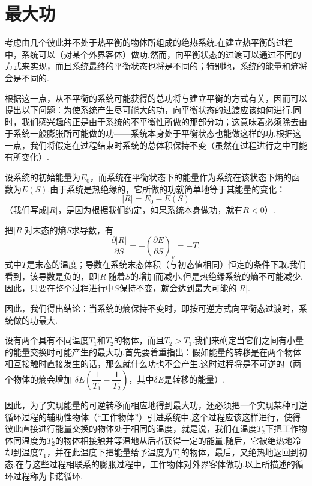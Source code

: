 \section{最大功}

考虑由几个彼此并不处于热平衡的物体所组成的绝热系统.在建立热平衡的过程中，系统可以（对某个外界客体）做功.然而，向平衡状态的过渡可以通过不同的方式来实现，而且系统最终的平衡状态也将是不同的；特别地，系统的能量和熵将会是不同的.

根据这一点，从不平衡的系统可能获得的总功将与建立平衡的方式有关，因而可以提出以下问题：为使系统产生尽可能大的功，向平衡状态的过渡应该如何进行.同时，我们感兴趣的正是由于系统的不平衡性所做的那部分功；这意味着必须除去由于系统一般膨胀所可能做的功——系统本身处于平衡状态也能做这样的功.根据这一点，我们将假定在过程结束时系统的总体积保持不变（虽然在过程进行之中可能有所变化）.

设系统的初始能量为$E_0$，而系统在平衡状态下的能量作为系统在该状态下熵的函数为$E(S)$.由于系统是热绝缘的，它所做的功就简单地等于其能量的变化：
\begin{equation*}
  |R|=E_0-E(S)
\end{equation*}
（我们写成$|R|$，是因为根据我们约定，如果系统本身做功，就有$R<0$）.

把$|R|$对末态的熵$S$求导数，有
\begin{equation*}
  \frac{\partial|R|}{\partial S}
  =-\left(\frac{\partial E}{\partial S}\right)_v=-T,
\end{equation*}
式中$T$是末态的温度；导数在系统末态体积（与初态值相同）恒定的条件下取.我们看到，该导数是负的，即$|R|$随着$S$的增加而减小.但是热绝缘系统的熵不可能减少.因此，只要在整个过程进行中$S$保持不变，就会达到最大可能的$|R|$.

因此，我们得出结论：当系统的熵保持不变时，即按可逆方式向平衡态过渡时，系统做的功最大.

设有两个具有不同温度$T_1$和$T_2$的物体，而且$T_2>T_1$.我们来确定当它们之间有小量的能量交换时可能产生的最大功.首先要着重指出：假如能量的转移是在两个物体相互接触时直接发生的话，那么就什么功也不会产生.这时过程将是不可逆的（两个物体的熵会增加
$\delta E\left(\dfrac{1}{T_1}-\dfrac{1}{T_2}\right)$，其中$\delta E$是转移的能量）.

因此，为了实现能量的可逆转移而相应地得到最大功，还必须把一个实现某种可逆循环过程的辅助性物体（“工作物体”）引进系统中.这个过程应该这样进行，使得彼此直接进行能量交换的物体处于相同的温度，就是说，我们在温度$T_2$下把工作物体同温度为$T_2$的物体相接触并等温地从后者获得一定的能量.随后，它被绝热地冷却到温度$T_1$，并在此温度下把能量给予温度为$T_1$的物体，最后，又绝热地返回到初态.在与这些过程相联系的膨胀过程中，工作物体对外界客体做功.以上所描述的循环过程称为卡诺循环.

